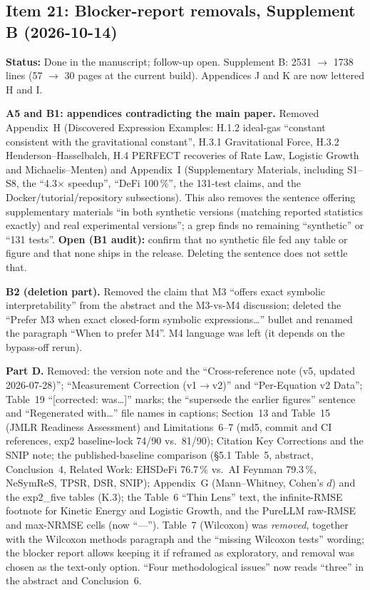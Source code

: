 \documentclass[11pt]{article}
\begin{document}
\subsection*{Item 21: Blocker-report removals, Supplement B (2026-10-14)}
\textbf{Status:} Done in the manuscript; follow-up open. Supplement B: 2531 $\to$ 1738 lines (57 $\to$ 30 pages at the current build). Appendices J and K are now lettered H and I.

\textbf{A5 and B1: appendices contradicting the main paper.} Removed Appendix~H (Discovered Expression Examples: H.1.2 ideal-gas ``constant consistent with the gravitational constant'', H.3.1 Gravitational Force, H.3.2 Henderson--Hasselbalch, H.4 PERFECT recoveries of Rate Law, Logistic Growth and Michaelis--Menten)
and Appendix~I (Supplementary Materials, including S1--S8, the ``4.3$\times$ speedup'', ``DeFi 100\,\%'', the 131-test claims, and the Docker/tutorial/repository subsections).
This also removes the sentence offering supplementary materials ``in both synthetic versions (matching reported statistics exactly) and real experimental versions''; a grep finds no remaining ``synthetic'' or ``131 tests''.
\textbf{Open (B1 audit):} confirm that no synthetic file fed any table or figure and that none ships in the release. Deleting the sentence does not settle that.

\textbf{B2 (deletion part).} Removed the claim that M3 ``offers exact symbolic interpretability'' from the abstract and the M3-vs-M4 discussion; deleted the ``Prefer M3 when exact closed-form symbolic expressions\ldots'' bullet and renamed the paragraph ``When to prefer M4''. M4 language was left (it depends on the bypass-off rerun).

\textbf{Part D.} Removed: the version note and the ``Cross-reference note (v5, updated 2026-07-28)''; ``Measurement Correction (v1$\to$v2)'' and ``Per-Equation v2 Data''; Table~19 ``[corrected: was\ldots]'' marks; the ``supersede the earlier figures'' sentence and ``Regenerated with\ldots'' file names in captions;
Section~13 and Table~15 (JMLR Readiness Assessment) and Limitations~6--7 (md5, commit and CI references, exp2 baseline-lock 74/90 vs.\ 81/90); Citation Key Corrections and the SNIP note;
the published-baseline comparison (\S5.1 Table~5, abstract, Conclusion~4, Related Work: EHSDeFi 76.7\,\% vs.\ AI Feynman 79.3\,\%, NeSymReS, TPSR, DSR, SNIP); Appendix~G (Mann--Whitney, Cohen's $d$) and the exp2\_five tables (K.3);
the Table~6 ``Thin Lens'' text, the infinite-RMSE footnote for Kinetic Energy and Logistic Growth, and the PureLLM raw-RMSE and max-NRMSE cells (now ``---'').
Table~7 (Wilcoxon) was \emph{removed}, together with the Wilcoxon methods paragraph and the ``missing Wilcoxon tests'' wording; the blocker report allows keeping it if reframed as exploratory, and removal was chosen as the text-only option. ``Four methodological issues'' now reads ``three'' in the abstract and Conclusion~6.
\end{document}

